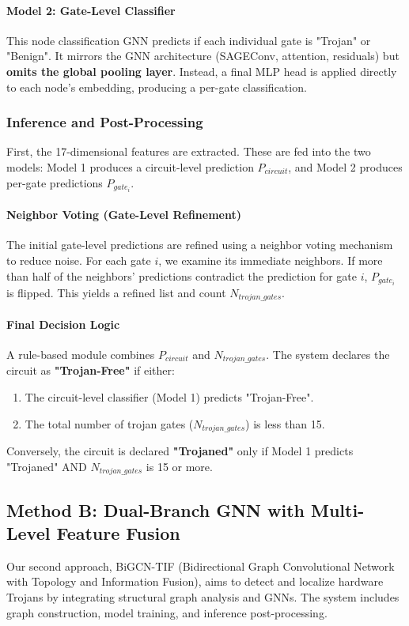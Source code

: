 \documentclass[conference]{IEEEtran}
\begin{document}
\paragraph{Model 2: Gate-Level Classifier}
This node classification GNN predicts if each individual gate is "Trojan" or "Benign". It mirrors the GNN architecture (SAGEConv, attention, residuals) but \textbf{omits the global pooling layer}. Instead, a final MLP head is applied directly to each node's embedding, producing a per-gate classification.

\subsubsection{Inference and Post-Processing}
First, the 17-dimensional features are extracted. These are fed into the two models: Model 1 produces a circuit-level prediction $P_{circuit}$, and Model 2 produces per-gate predictions $P_{gate_i}$.

\paragraph{Neighbor Voting (Gate-Level Refinement)}
The initial gate-level predictions are refined using a neighbor voting mechanism to reduce noise. For each gate $i$, we examine its immediate neighbors. If more than half of the neighbors' predictions contradict the prediction for gate $i$, $P_{gate_i}$ is flipped. This yields a refined list and count $N_{trojan\_gates}$.

\paragraph{Final Decision Logic}
A rule-based module combines $P_{circuit}$ and $N_{trojan\_gates}$. The system declares the circuit as \textbf{"Trojan-Free"} if either:
\begin{enumerate}
    \item The circuit-level classifier (Model 1) predicts "Trojan-Free".
    \item The total number of trojan gates ($N_{trojan\_gates}$) is less than 15.
\end{enumerate}
Conversely, the circuit is declared \textbf{"Trojaned"} only if Model 1 predicts "Trojaned" AND $N_{trojan\_gates}$ is 15 or more.

\FloatBarrier
\subsection{Method B: Dual-Branch GNN with Multi-Level Feature Fusion}
\label{sec:method_B}
Our second approach, BiGCN-TIF (Bidirectional Graph Convolutional Network with Topology and Information Fusion), aims to detect and localize hardware Trojans by integrating structural graph analysis and GNNs. The system includes graph construction, model training, and inference post-processing.
\end{document}
